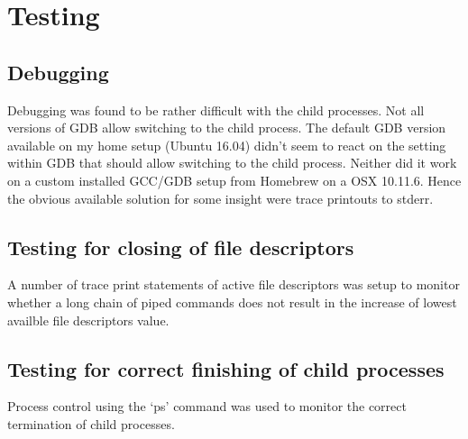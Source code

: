 \documentclass[a4paper,11pt,twoside]{article}
\begin{document}
\section{Testing}

\subsection{Debugging}
Debugging was found to be rather difficult with the child processes. Not all versions of GDB allow switching to the child process. The default GDB version available on my home setup (Ubuntu 16.04) didn't seem to react on the setting within GDB that should allow switching to the child process. Neither did it work on a custom installed GCC/GDB setup from Homebrew on a OSX 10.11.6. Hence the obvious available solution for some insight were trace printouts to stderr. 

\subsection{Testing for closing of file descriptors}
A number of trace print statements of active file descriptors was setup to monitor whether a long chain of piped commands does not result in the increase of lowest availble file descriptors value.

\subsection{Testing for correct finishing of child processes}
Process control using the `ps' command was used to monitor the correct termination of child processes. 


\end{document}
